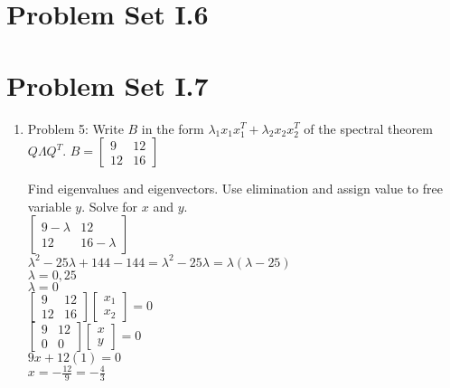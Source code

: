\documentclass{article}
\renewcommand{\(}{\left(}
\renewcommand{\)}{\right)}
\theoremstyle{plain}
\theoremstyle{plain}
\theoremstyle{definition}
\begin{document}
\section{Problem Set I.6}
\section{Problem Set I.7}
\begin{enumerate}[label*=\arabic*.,ref=\arabic*]
\item Problem 5: Write $B$ in the form $\lambda_1x_1x_1^T + \lambda_2x_2x_2^T$ of the spectral theorem $Q\Lambda Q^T$.  $B = \begin{bmatrix} 9 & 12 \\ 12 & 16 \end{bmatrix}$
\begin{shaded}
Find eigenvalues and eigenvectors. Use elimination and assign value to free variable $y$. Solve for $x$ and $y$. \\

$\begin{bmatrix} 9 - \lambda & 12 \\ 12 & 16 - \lambda \end{bmatrix}$ \\

$\lambda^2 - 25\lambda + 144 - 144 = \lambda^2 - 25\lambda = \lambda(\lambda - 25)$ \\
$\lambda = 0, 25$ \\

$\lambda = 0$ \\

$\begin{bmatrix} 9 & 12 \\ 12 & 16 \end{bmatrix} \begin{bmatrix} x_1 \\ x_2 \end{bmatrix} = 0$ \\

$\begin{bmatrix} 9 & 12 \\ 0 & 0 \end{bmatrix} \begin{bmatrix} x \\ y \end{bmatrix} = 0$ \\

$9x + 12(1) = 0$ \\

$x = -\frac{12}{9} = -\frac{4}{3}$ \\


\end{shaded}
\end{enumerate}
\end{document}
